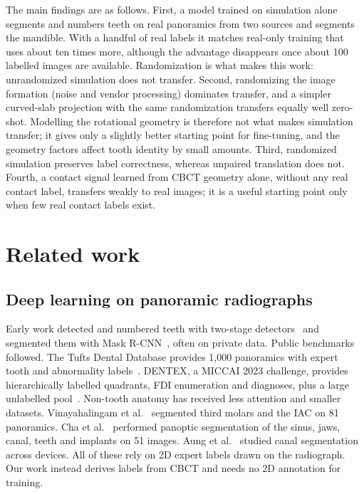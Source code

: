 \documentclass[preprint,12pt]{elsarticle}
\begin{document}
The main findings are as follows. First, a model trained on simulation alone segments and numbers teeth on real
panoramics from two sources and segments the mandible. With a handful of real labels it matches real-only training that
uses about ten times more, although the advantage disappears once about 100 labelled images are available.
Randomization is what makes this work: unrandomized simulation does not transfer. Second, randomizing the image
formation (noise and vendor processing) dominates transfer, and a simpler curved-slab projection with the same
randomization transfers equally well zero-shot. Modelling the rotational geometry is therefore not what makes
simulation transfer; it gives only a slightly better starting point for fine-tuning, and the geometry factors affect
tooth identity by small amounts. Third, randomized simulation preserves label correctness, whereas unpaired
translation does not. Fourth, a contact signal learned from CBCT geometry alone, without any real contact label, transfers weakly to real
images; it is a useful starting point only when few real contact labels exist.

\section{Related work}

\subsection{Deep learning on panoramic radiographs}
Early work detected and numbered teeth with two-stage detectors~\cite{tuzoff2019} and segmented them with Mask
R-CNN~\cite{jader2018}, often on private data. Public benchmarks followed. The Tufts Dental Database provides 1,000
panoramics with expert tooth and abnormality labels~\cite{panetta2022}. DENTEX, a MICCAI 2023 challenge, provides
hierarchically labelled quadrants, FDI enumeration and diagnoses, plus a large unlabelled pool~\cite{hamamci2023}.
Non-tooth anatomy has received less attention and smaller datasets. Vinayahalingam et al.~\cite{vinayahalingam2019}
segmented third molars and the IAC on 81 panoramics. Cha et al.~\cite{cha2021} performed panoptic segmentation of the
sinus, jaws, canal, teeth and implants on 51 images. Aung et al.~\cite{aung2024} studied canal segmentation across
devices. All of these rely on 2D expert labels drawn on the radiograph. Our work instead derives labels from CBCT and
needs no 2D annotation for training.
\end{document}
